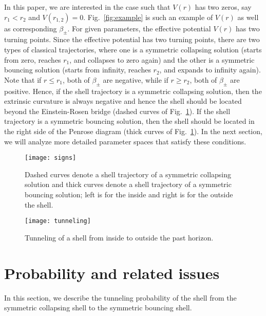 \documentclass[preprintnumbers,10pt,nofootinbib]{revtex4}
\begin{document}
In this paper, we are interested in the case such that $V(r)$ has two zeros, say $r_{1} < r_{2}$ and $V(r_{1,2}) = 0$. Fig.~\ref{fig:example} is such an example of $V(r)$ as well as corresponding $\beta_{\pm}$. For given parameters, the effective potential $V(r)$ has two turning points. Since the effective potential has two turning points, there are two types of classical trajectories, where one is a symmetric collapsing solution (starts from zero, reaches $r_{1}$, and collapses to zero again) and the other is a symmetric bouncing solution (starts from infinity, reaches $r_{2}$, and expands to infinity again). Note that if $r \leq r_{1}$, both of $\beta_{\pm}$ are negative, while if $r \geq r_{2}$, both of $\beta_{\pm}$ are positive. Hence, if the shell trajectory is a symmetric collapsing solution, then the extrinsic curvature is always negative and hence the shell should be located beyond the Einstein-Rosen bridge (dashed curves of Fig.~\ref{fig:signs}). If the shell trajectory is a symmetric bouncing solution, then the shell should be located in the right side of the Penrose diagram (thick curves of Fig.~\ref{fig:signs}). In the next section, we will analyze more detailed parameter spaces that satisfy these conditions.


\begin{figure}
\begin{center}
\texttt{[image: signs]}
\caption{\label{fig:signs}Dashed curves denote a shell trajectory of a symmetric collapsing solution and thick curves denote a shell trajectory of a symmetric bouncing solution; left is for the inside and right is for the outside the shell.}
\end{center}
\end{figure}
\begin{figure}
\begin{center}
\texttt{[image: tunneling]}
\caption{\label{fig:tunneling}Tunneling of a shell from inside to outside the past horizon.}
\end{center}
\end{figure}

\section{\label{sec:prob}Probability and related issues}

In this section, we describe the tunneling probability of the shell from the symmetric collapsing shell to the symmetric bouncing shell.
\end{document}

